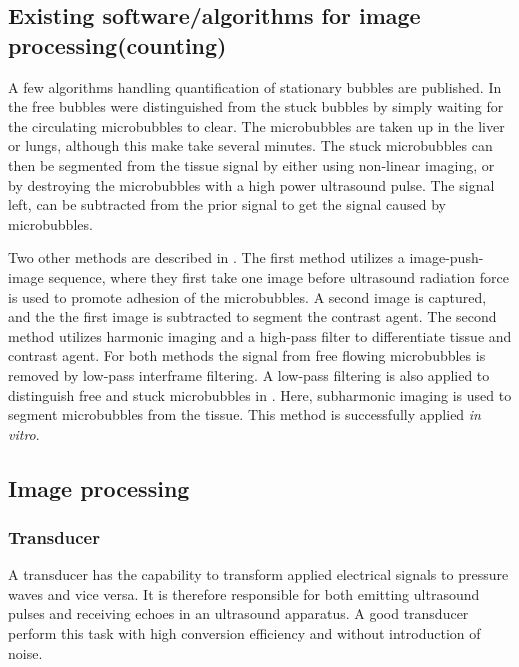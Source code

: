   


\subsection{Existing software/algorithms for image processing(counting)}
\label{existing algorithms}
A few algorithms handling quantification of stationary bubbles are published. In \cite{Rychak2006} the free bubbles were distinguished from the stuck bubbles by simply waiting for the circulating microbubbles to clear. The microbubbles are taken up in the liver or lungs, although this make take several minutes. The stuck microbubbles can then be segmented from the tissue signal by either using non-linear imaging, or by destroying the microbubbles with a high power ultrasound pulse. The signal left, can be subtracted from the prior signal to get the signal caused by microbubbles.

Two other methods are described in \cite{Zhao2007}. The first method utilizes a image-push-image sequence, where they first take one image before ultrasound radiation force is used to promote adhesion of the microbubbles. A second image is captured, and the the first image is subtracted to segment the contrast agent. The second method utilizes harmonic imaging and a high-pass filter to differentiate tissue and contrast agent. For both methods the signal from free flowing microbubbles is removed by low-pass interframe filtering. A low-pass filtering is also applied to distinguish free and stuck microbubbles in \cite{Needles2009}. Here, subharmonic imaging is used to segment microbubbles from the tissue. This method is successfully applied \textit{in vitro}.  
   
\subsection{Image processing}
\subsubsection{Transducer}
A transducer has the capability to transform applied electrical signals to pressure waves and vice versa. It is therefore responsible for both emitting ultrasound pulses and receiving echoes in an ultrasound apparatus. A good transducer perform this task with high conversion efficiency and without introduction of noise. 

